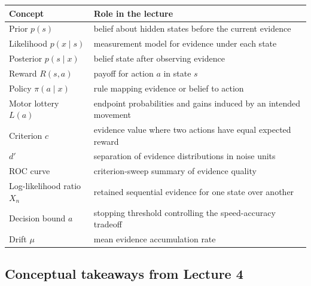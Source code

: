 \begin{center}
\begin{tabular}{lp{}}
\hline
Concept & Role in the lecture \\
\hline
Prior \(p(s)\) & belief about hidden states before the current evidence \\
Likelihood \(p(x\mid s)\) & measurement model for evidence under each state \\
Posterior \(p(s\mid x)\) & belief state after observing evidence \\
Reward \(R(s,a)\) & payoff for action \(a\) in state \(s\) \\
Policy \(\pi(a\mid x)\) & rule mapping evidence or belief to action \\
Motor lottery \(L(a)\) & endpoint probabilities and gains induced by an intended movement \\
Criterion \(c\) & evidence value where two actions have equal expected reward \\
\(d'\) & separation of evidence distributions in noise units \\
ROC curve & criterion-sweep summary of evidence quality \\
Log-likelihood ratio \(X_n\) & retained sequential evidence for one state over another \\
Decision bound \(a\) & stopping threshold controlling the speed-accuracy tradeoff \\
Drift \(\mu\) & mean evidence accumulation rate \\
\hline
\end{tabular}
\end{center}

\subsection{Conceptual takeaways from Lecture 4}

